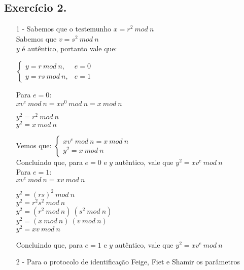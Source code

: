 \documentclass[12pt]{article}
\begin{document}
	\subsection*{Exercício 2.}
		\begin{itemize}
			\item[1 -]
				Sabemos que o testemunho $x = r^2 \ mod \ n $\\
				Sabemos que $v = s^2 \ mod \ n$\\
				$y$ é autêntico, portanto vale que:
				\begin{center}								
					$ \begin{cases} 
					y = r \ mod \ n, & e = 0 \\ 
					y = rs \ mod \ n, & e = 1
					\end{cases}
					$
				\end{center}
				Para $e = 0$:\\
				$xv^{e} \ mod \ n = xv^{0} \ mod \ n = x \ mod \ n$\\
				\begin{center} 
					$y^2 = r^2 \ mod \ n$\\
					$y^2 = x \ mod \ n$\\
				\end{center}
				Vemos que:
				$ \begin{cases} 
					xv^{e} \ mod \ n =  x \ mod \ n \\ y^2 = x \ mod \ n
					\end{cases}
				$\\
				Concluindo que, para $e = 0$ e $y$ autêntico, vale que $y^2 = xv^{e} \
				mod \ n$\\
				\newline
				Para $e = 1$:\\
				$xv^{e} \ mod \ n = xv \ mod \ n$\\
				\begin{center} 
					$y^2 = (rs)^2 \ mod \ n$\\
					$y^2 = r^2s^2 \ mod \ n$\\
					$y^2 = (r^2 \ mod \ n) \ (s^2 \ mod \ n)$\\
					$y^2 = (x \ mod \ n) \ (v \ mod \ n)$\\
					$y^2 = xv \ mod \ n$\\					
				\end{center}
				Concluindo que, para $e = 1$ e $y$ autêntico, vale que $y^2 = xv^{e} \
				mod \ n$
			\item[2 -]
				Para o protocolo de identificação Feige, Fiet e Shamir os parâmetros

\end{itemize}
\end{document}

